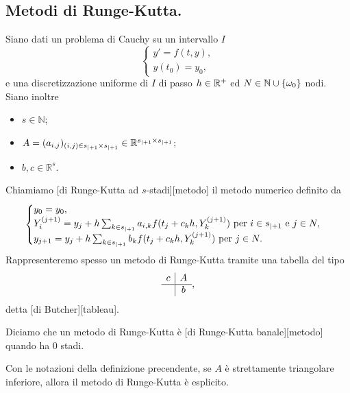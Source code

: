 \subsection{Metodi di Runge-Kutta.}
\label{MetodiNumericiPerEquazioniDifferenzialiOrdinarie_MetodiDiRungeKutta}
\begin{Definition}
\label{MetodiNumericiPerEquazioniDifferenzialiOrdinarie_Definizione_MetodoDiRungeKutta}
	Siano dati un problema di Cauchy su un intervallo $I$
	\[
	\begin{cases}
		y' = f(t,y),\\
		y(t_0) = y_0,
	\end{cases}
	\]
	e una discretizzazione uniforme di $I$ di passo $h \in \mathbb{R}^+$ ed $N \in \mathbb{N} \cup \lbrace \omega_0 \rbrace$ nodi. Siano inoltre
	\begin{itemize}
		\item $s \in \mathbb{N}$;
		\item $A = (a_{i,j})_{(i,j) \in {s}_{|+ 1} \times {s}_{|+ 1}} \in \mathbb{R}^{{s}_{|+ 1} \times {s}_{|+ 1}}$;
		\item $b, c \in \mathbb{R}^s$.
	\end{itemize}
	Chiamiamo [di Runge-Kutta ad $s$-stadi][metodo] il metodo numerico definito da
	\[
	\begin{cases}
		y_0 = y_0,\\
		Y_i^{(j + 1)} = y_j + h\sum_{k \in {s}_{|+ 1}} a_{i,k}f(t_j + c_kh,Y_k^{(j + 1)})\text{ per }i \in {s}_{|+ 1}\text{ e }j \in N,\\
		y_{j + 1} = y_j + h\sum_{k \in {s}_{|+ 1}} b_k f(t_j + c_kh,Y_k^{(j + 1)})\text{ per }j \in N.
	\end{cases}
	\]
	Rappresenteremo spesso un metodo di Runge-Kutta tramite una tabella del tipo
	\[
	\begin{array}{c|c}
		c	&	A\\
		\hline
			&	b
	\end{array},
	\]
	detta [di Butcher][tableau].
\end{Definition}
\begin{Definition}
	Diciamo che un metodo di Runge-Kutta \`e [di Runge-Kutta banale][metodo] quando ha $0$ stadi.
\end{Definition}
\begin{Theorem}
	Con le notazioni della definizione precendente, se $A$ \`e strettamente triangolare inferiore, allora il metodo di Runge-Kutta \`e esplicito.
\end{Theorem}
